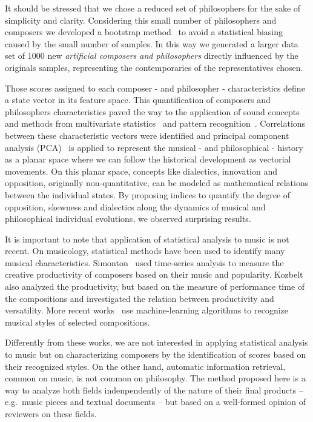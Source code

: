 \documentclass[
 aip,
 jmp,
 amsmath,amssymb,
 reprint,
]{revtex4-1}
\begin{document}
It should be stressed that we chose a reduced set of philosophers for the
sake of simplicity and clarity. Considering this
small number of philosophers and composers we developed a bootstrap method~\cite{Varian} to avoid a statistical biasing caused by the small number of samples. In this way we generated a larger data set of 1000 new \emph{artificial composers and philosophers} directly influenced by the originals samples, representing the contemporaries of the representatives chosen.

Those scores assigned to each composer - and philosopher - characteristics define a state vector in its feature space. This quantification of composers and philosophers characteristics paved the way to the application of sound concepts and methods from multivariate statistics~\cite{Papoulis, Wichern,
Therrien} and pattern recognition~\cite{Duda, Costa}. Correlations between these characteristic vectors were identified and principal component
analysis (PCA)~\cite{Costa} is applied to
represent the musical - and philosophical - history as a planar space where we can follow the historical development as vectorial movements. On this planar space, concepts like dialectics, innovation and opposition, originally non-quantitative, can be modeled as mathematical relations between the individual states. By proposing indices to quantify the
degree of opposition, skewness and dialectics along the dynamics of
musical and philosophical individual evolutions, we observed surprising results.

It is important to note that application of statistical analysis to
music is not recent. On musicology, statistical methods have been used
to identify many musical characteristics.
Simonton~\cite{Simonton1991829, Simonton1977791} used time-series analysis to measure the creative productivity
of composers based on their music and popularity. Kozbelt~\cite{Kozbelt01012009, Kozbelt01012007} also
analyzed the productivity, but based on the measure of performance
time of the compositions and investigated the relation between
productivity and versatility. More recent works~\cite{Kranenburg2004, Kranenburg2007} use machine-learning
algorithms to recognize musical styles of selected compositions. 

Differently from these works, we are not interested in applying
statistical analysis to music but on characterizing composers by the identification of scores based on their recognized styles. On the other hand, automatic information retrieval, common on music, is not common on philosophy. The method proposed here is a way to analyze both fields indenpendently of the nature of their final products -- e.g.\ music pieces and textual documents -- but based on a well-formed opinion of reviewers on these fields.
\end{document}
